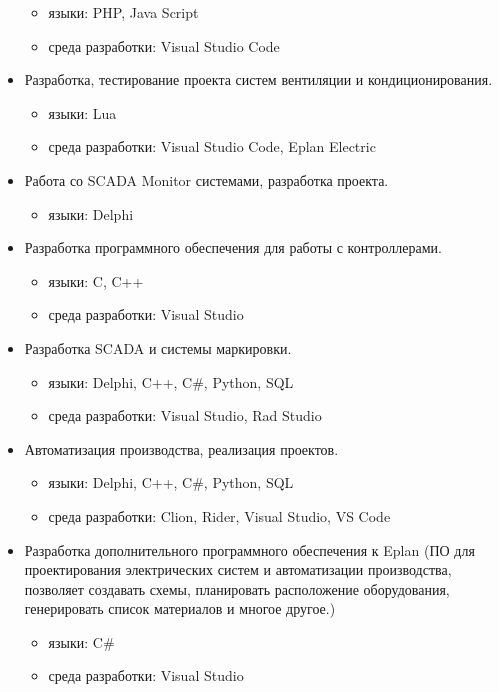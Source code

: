 \begin{itemize}
\begin{itemize}
       \item языки: PHP, Java Script
       \item среда разработки: Visual Studio Code
   \end{itemize}
   \item Разработка, тестирование проекта систем вентиляции и кондиционирования.
   \begin{itemize}
       \item языки: Lua
       \item среда разработки: Visual Studio Code, Eplan Electric
   \end{itemize}
   \item Работа со SCADA Monitor системами, разработка проекта.
   \begin{itemize}
       \item языки: Delphi
   \end{itemize}
   \item Разработка программного обеспечения для работы с контроллерами.
   \begin{itemize}
       \item языки: C, C++
       \item среда разработки: Visual Studio
   \end{itemize}
   \item Разработка SCADA и системы маркировки.
   \begin{itemize}
       \item языки: Delphi, C++, C\#, Python, SQL
       \item среда разработки: Visual Studio, Rad Studio
   \end{itemize}
   \item Автоматизация производства, реализация проектов.
   \begin{itemize}
      \item языки: Delphi, C++, C\#, Python, SQL
      \item среда разработки: Clion, Rider, Visual Studio, VS Code
  \end{itemize}
  \item  Разработка дополнительного программного обеспечения к Eplan (ПО для проектирования электрических систем и автоматизации производства, позволяет создавать схемы, планировать расположение оборудования, генерировать список материалов и многое другое.)
  \begin{itemize}
      \item языки: C\#
      \item среда разработки: Visual Studio

\end{itemize}
\end{itemize}

